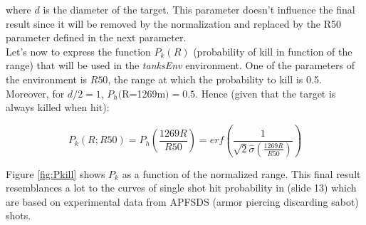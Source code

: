 where $d$ is the diameter of the target. This parameter doesn't influence the final result since it will be removed by the normalization and replaced by the R50 parameter defined in the next parameter.\\

Let's now to express the function $P_k(R)$ (probability of kill in function of the range) that will be used in the \textit{tanksEnv} environment. One of the parameters of the environment is $R50$, the range at which the probability to kill is 0.5. Moreover, for $d/2=1$, $P_h($R=1269m$)=0.5$. Hence (given that the target is always killed when hit):

\begin{equation} \label{eq:Pkill}
    P_k(R;R50) = P_h\left(\frac{1269 R}{R50}\right) = erf\left( \frac{1}{\sqrt{2}\hat{\sigma}(\frac{1269 R}{R50})}\right)
\end{equation}

Figure \ref{fig:Pkill} shows $P_k$ as a function of the normalized range. This final result resemblances a lot to the curves of single shot hit probability in \cite{abalcurves} (slide 13) which are based on experimental data from APFSDS (armor piercing discarding sabot) shots. 